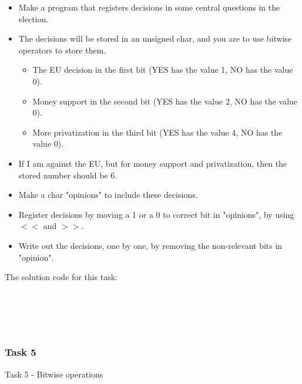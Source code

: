 \documentclass{report}
\begin{document}
			\begin{itemize}
				\item Make a program that registers decisions in some central questions in the election.
				\item The decisions will be stored in an unsigned char, and you are to use bitwise operators to store them.
				\begin{itemize}
					\item The EU decision in the first bit (YES has the value 1, NO has the value 0).
					\item Money support in the second bit (YES has the value 2, NO has the value 0).
					\item More privatization in the third bit (YES has the value 4, NO has the value 0).
				\end{itemize}
				\item If I am against the EU, but for money support and privatization, then the stored number should be 6.
				\item Make a char "opinions" to include these decisions.
				\item Register decisions by moving a 1 or a 0 to correct bit in "opinions", by using $<<$ and $>>$.
				\item Write out the decisions, one by one, by removing the non-relevant bits in "opinion".
			\end{itemize}
			
			
			\begin{minipage}{\linewidth}
				The solution code for this task:
				\begin{lstlisting}
					
				\end{lstlisting}
			\end{minipage}
			\\ \\
		
		
		
		
		
		
		
		
		
		
		
		
		
		
		
		\iffalse
		
		
		\subsubsection{Task 5}
		Task 5 - Bitwise operations \\
		
\end{document}
